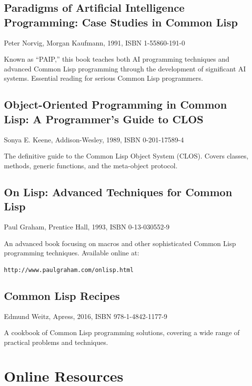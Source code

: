 \subsection{Paradigms of Artificial Intelligence Programming: Case Studies in Common Lisp}

Peter Norvig, Morgan Kaufmann, 1991, ISBN 1-55860-191-0

Known as ``PAIP,'' this book teaches both AI programming techniques and advanced Common
Lisp programming through the development of significant AI systems. Essential reading for
serious Common Lisp programmers.

\subsection{Object-Oriented Programming in Common Lisp: A Programmer's Guide to CLOS}

Sonya E. Keene, Addison-Wesley, 1989, ISBN 0-201-17589-4

The definitive guide to the Common Lisp Object System (CLOS). Covers classes, methods,
generic functions, and the meta-object protocol.

\subsection{On Lisp: Advanced Techniques for Common Lisp}

Paul Graham, Prentice Hall, 1993, ISBN 0-13-030552-9

An advanced book focusing on macros and other sophisticated Common Lisp programming
techniques. Available online at:

\begin{center}
\texttt{http://www.paulgraham.com/onlisp.html}
\end{center}

\subsection{Common Lisp Recipes}

Edmund Weitz, Apress, 2016, ISBN 978-1-4842-1177-9

A cookbook of Common Lisp programming solutions, covering a wide range of practical
problems and techniques.

\section{Online Resources}

